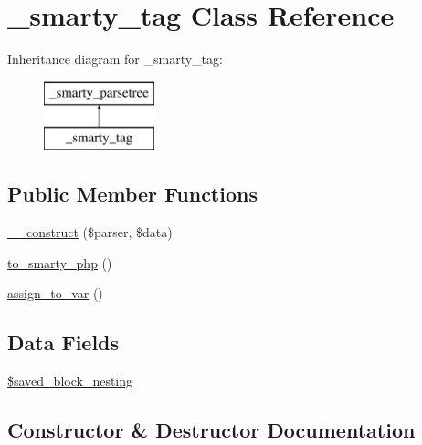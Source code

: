 \hypertarget{class__smarty__tag}{}\section{\+\_\+smarty\+\_\+tag Class Reference}
\label{class__smarty__tag}
Inheritance diagram for \+\_\+smarty\+\_\+tag\+:\begin{figure}[H]
\begin{center}
\leavevmode
\includegraphics[height=2.000000cm]{class__smarty__tag}
\end{center}
\end{figure}
\subsection*{Public Member Functions}
\begin{DoxyCompactItemize}
\item 
\hyperlink{class__smarty__tag_a8bf0c7185614e24046caa9973a890ea6}{\+\_\+\+\_\+construct} (\$parser, \$data)
\item 
\hyperlink{class__smarty__tag_a22e90607877f31ace864587efcf8ed28}{to\+\_\+smarty\+\_\+php} ()
\item 
\hyperlink{class__smarty__tag_a51862ab89229bc5f9419a458f623bd81}{assign\+\_\+to\+\_\+var} ()
\end{DoxyCompactItemize}
\subsection*{Data Fields}
\begin{DoxyCompactItemize}
\item 
\hyperlink{class__smarty__tag_ab7251b2e342daee7be6f92032fa12424}{\$saved\+\_\+block\+\_\+nesting}
\end{DoxyCompactItemize}


\subsection{Constructor \& Destructor Documentation}
\hypertarget{class__smarty__tag_a8bf0c7185614e24046caa9973a890ea6}{}
